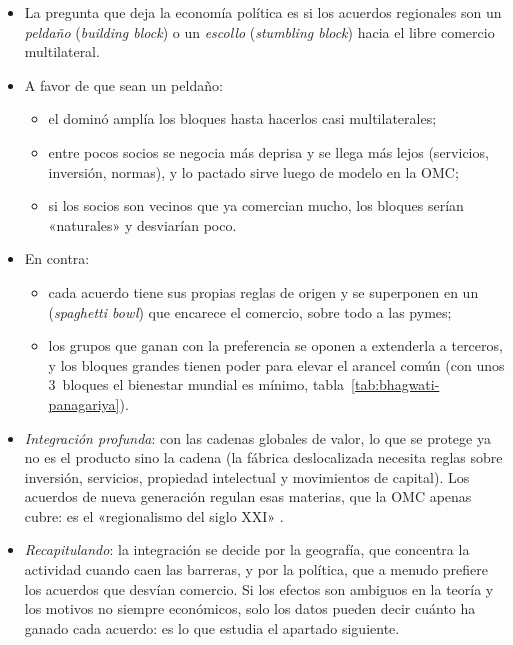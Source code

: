 \documentclass[11pt]{article}
\begin{document}
\begin{itemize}
\item La pregunta que deja la economía política es si los acuerdos regionales son un \emph{peldaño} (\emph{building block}) o un \emph{escollo} (\emph{stumbling block}) hacia el libre comercio multilateral\nocite{Bhagwati1991World}.
\item A favor de que sean un peldaño:
  \begin{itemize}
  \item el dominó amplía los bloques hasta hacerlos casi multilaterales\nocite{Baldwin1993Domino};
  \item entre pocos socios se negocia más deprisa y se llega más lejos (servicios, inversión, normas), y lo pactado sirve luego de modelo en la OMC;
  \item si los socios son vecinos que ya comercian mucho, los bloques serían «naturales» y desviarían poco\nocite{FrankelSteinWei1995}.
  \end{itemize}
\item En contra:
  \begin{itemize}
  \item cada acuerdo tiene sus propias reglas de origen y se superponen en un  (\emph{spaghetti bowl}) que encarece el comercio, sobre todo a las pymes\nocite{Bhagwati1995Infatuation};
  \item los grupos que ganan con la preferencia se oponen a extenderla a terceros, y los bloques grandes tienen poder para elevar el arancel común (con unos 3~bloques el bienestar mundial es mínimo, tabla~\ref{tab:bhagwati-panagariya}).
  \end{itemize}
\item \emph{Integración profunda}: con las cadenas globales de valor, lo que se protege ya no es el producto sino la cadena (la fábrica deslocalizada necesita reglas sobre inversión, servicios, propiedad intelectual y movimientos de capital). Los acuerdos de nueva generación regulan esas materias, que la OMC apenas cubre: es el «regionalismo del siglo XXI»\nocite{Lawrence1996Regionalism,Baldwin2011Regionalism} .
\item \emph{Recapitulando}: la integración se decide por la geografía, que concentra la actividad cuando caen las barreras, y por la política, que a menudo prefiere los acuerdos que desvían comercio. Si los efectos son ambiguos en la teoría y los motivos no siempre económicos, solo los datos pueden decir cuánto ha ganado cada acuerdo: es lo que estudia el apartado siguiente.
\end{itemize}
\end{document}
